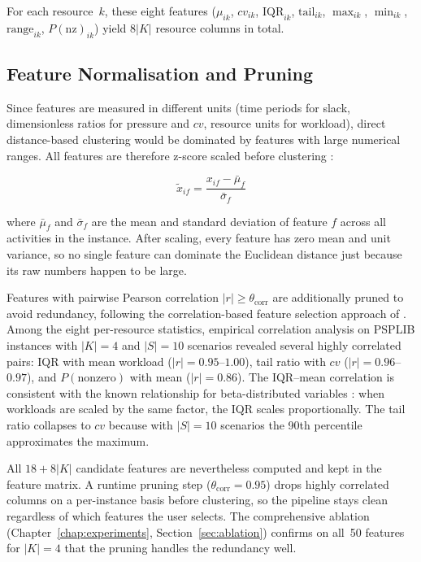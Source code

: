 For each resource~$k$, these eight features ($\mu_{ik}$,
$cv_{ik}$, $\mathrm{IQR}_{ik}$, $\mathrm{tail}_{ik}$,
$\max_{ik}$, $\min_{ik}$, $\mathrm{range}_{ik}$,
$P(\text{nz})_{ik}$) yield $8|K|$ resource columns in total.

\subsection{Feature Normalisation and Pruning}
\label{subsec:feat_norm}
Since features are measured in different units (time periods for
slack, dimensionless ratios for pressure and $cv$, resource units
for workload), direct distance-based clustering would be dominated
by features with large numerical ranges. All features are
therefore z-score scaled before clustering \parencite{Jain1999}:

\begin{equation}
    \tilde{x}_{if} = \frac{x_{if} - \bar{\mu}_f}{\bar{\sigma}_f}
    \label{eq:zscore}
\end{equation}

where $\bar{\mu}_f$ and $\bar{\sigma}_f$ are the mean and standard
deviation of feature $f$ across all activities in the instance.
After scaling, every feature has zero mean and unit variance,
so no single feature can dominate the Euclidean distance just
because its raw numbers happen to be large.

Features with pairwise Pearson correlation $|r| \geq
\theta_{\mathrm{corr}}$ are additionally pruned to avoid
redundancy, following the correlation-based feature selection
approach of \parencite{Hall1999}. Among the eight per-resource
statistics, empirical correlation analysis on PSPLIB instances
with $|K|=4$ and $|S|=10$ scenarios revealed several highly
correlated pairs: IQR with mean workload
($|r| = 0.95$--$1.00$), tail ratio with $cv$
($|r| = 0.96$--$0.97$), and $P(\text{nonzero})$ with mean
($|r| = 0.86$). The IQR--mean correlation is consistent with
the known relationship for beta-distributed variables
\parencite{Lamas2016}: when workloads are scaled by the same
factor, the IQR scales proportionally. The tail ratio
collapses to $cv$ because with $|S|=10$ scenarios the 90th
percentile approximates the maximum.

All $18 + 8|K|$ candidate features are nevertheless computed
and kept in the feature matrix. A runtime pruning step
($\theta_{\mathrm{corr}} = 0.95$) drops highly correlated
columns on a per-instance basis before clustering, so the
pipeline stays clean regardless of which features the user
selects. The comprehensive ablation
(Chapter~\ref{chap:experiments},
Section~\ref{sec:ablation}) confirms on all~50
features for $|K|=4$ that the pruning handles the redundancy
well.

